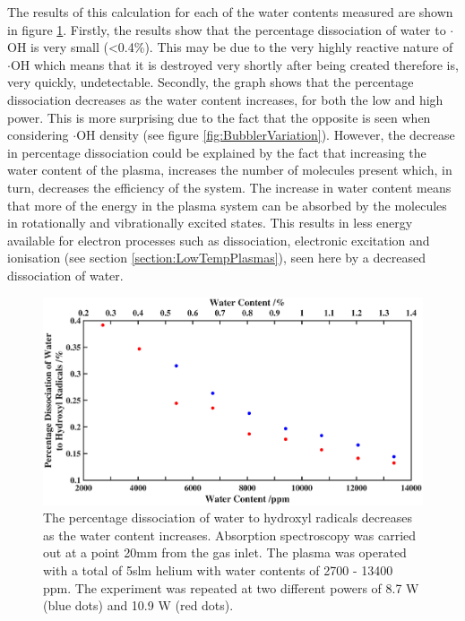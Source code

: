 \documentclass[11pt, oneside]{article}   	%
\begin{document}
The results of this calculation for each of the water contents measured are shown in figure \ref{fig:BubblerDissociation}.
Firstly, the results show that the percentage dissociation of water to $\cdot$OH is very small (\textless 0.4\%). This may be due to the very highly reactive nature of $\cdot$OH which means that it is destroyed very shortly after being created therefore is, very quickly, undetectable.
Secondly, the graph shows that the percentage dissociation decreases as the water content increases, for both the low and high power.
This is more surprising due to the fact that the opposite is seen when considering $\cdot$OH density (see figure \ref{fig:BubblerVariation}).
However, the decrease in percentage dissociation could be explained by the fact that increasing the water content of the plasma, increases the number of molecules present which, in turn, decreases the efficiency of the system.
The increase in water content means that more of the energy in the plasma system can be absorbed by the molecules in rotationally and vibrationally excited states.
This results in less energy available for electron processes such as dissociation, electronic excitation and ionisation (see section \ref{section:LowTempPlasmas}), seen here by a decreased dissociation of water.





\begin{figure}
    \centering
    \includegraphics[width=\textwidth]{Figures/WaterDissociation2.eps}
    \caption{The percentage dissociation of water to hydroxyl radicals decreases as the water content increases. Absorption spectroscopy was carried out at a point 20mm from the gas inlet. The plasma was operated with a total of 5slm helium with water contents of 2700 - 13400 ppm. The experiment was repeated at two different powers of 8.7 W (blue dots) and 10.9 W (red dots).}
    \label{fig:BubblerDissociation}
\end{figure}
\end{document}
